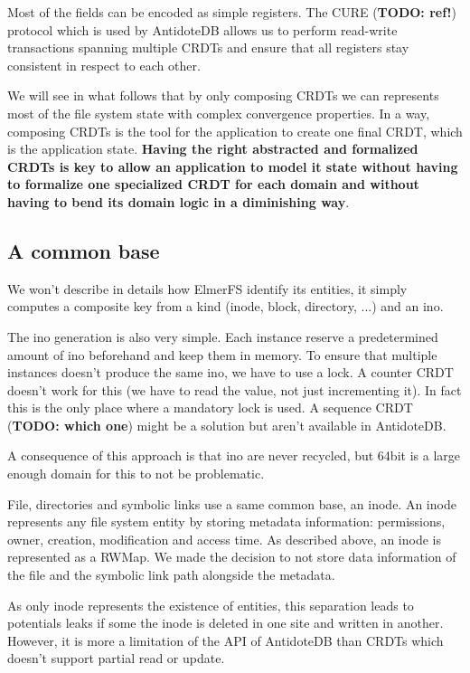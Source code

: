 \documentclass[sigplan, 10pt]{acmart}
\begin{document}
Most of the fields can be encoded as simple registers. The CURE (\textbf{TODO: ref!})
protocol which is used by AntidoteDB allows us to
perform read-write transactions spanning multiple CRDTs and ensure
that all registers stay consistent in respect to each other.

We will see in what follows that by only composing CRDTs we can represents
most of the file system state with complex convergence properties. In a way,
composing CRDTs is the tool for the application to create one final CRDT, which
is the application state. \textbf{Having the right abstracted and formalized CRDTs is
key to allow an application to model it state without having to
formalize one specialized CRDT for each domain and without having to bend
its domain logic in a diminishing way}.

\subsection{A common base}

We won't describe in details how ElmerFS identify its entities,
it simply computes a composite key from a kind
(inode, block, directory, ...) and an ino.

The ino generation is also very simple. Each instance reserve a predetermined
amount of ino beforehand and keep them in memory. To ensure that multiple
instances doesn't produce the same ino, we have to use a lock. A counter CRDT
doesn't work for this (we have to read the value, not just incrementing it). In fact
this is the only place where a mandatory lock is used.
A sequence CRDT (\textbf{TODO: which one}) might be a solution but aren't available in
AntidoteDB.

A consequence of this approach is that ino are never recycled, but 64bit is a
large enough domain for this to not be problematic.


File, directories and symbolic links use a same common base, an inode. An inode
represents any file system entity by storing metadata information:
permissions, owner, creation, modification and access
time. As described above, an inode is represented as a RWMap.
We made the decision to not store data information of the file and the
symbolic link path alongside the metadata.

As only inode represents the existence of entities, this separation leads to
potentials leaks if some the inode is deleted in one site and written in another.
However, it is more a limitation of the API of AntidoteDB than CRDTs which
doesn't support partial read or update.
\end{document}
